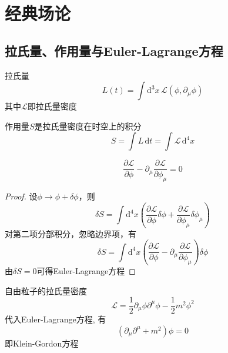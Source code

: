 \section{经典场论}
\subsection{拉氏量、作用量与Euler-Lagrange方程}
\begin{definition}
    拉氏量
    \begin{equation}
        L(t)=\int \mathrm d^3x \, \mathcal{L}(\phi, \partial_\mu \phi)
    \end{equation}
    其中$\mathcal L$即拉氏量密度
\end{definition}
\begin{definition}[作用量]
    作用量$S$是拉氏量密度在时空上的积分
    \begin{equation}
        S = \int L \, \mathrm{d}t=\int\mathcal L\,\mathrm d^4x
    \end{equation}
\end{definition}
\begin{equation}
    \frac{\partial\mathcal L}{\partial\phi}-\partial_\mu\frac{\partial\mathcal L}{\partial\phi_\mu}=0
\end{equation}
\begin{proof}
    设$\phi\to\phi+\delta\phi$，则
    \begin{equation}
        \delta S = \int \mathrm d^4x \left(\frac{\partial\mathcal L}{\partial\phi}\delta\phi + \frac{\partial\mathcal L}{\partial\phi_\mu}\delta\phi_\mu\right)
    \end{equation}
    对第二项分部积分，忽略边界项，有
    \begin{equation}
        \delta S = \int \mathrm d^4x \left(\frac{\partial\mathcal L}{\partial\phi} - \partial_\mu\frac{\partial\mathcal L}{\partial\phi_\mu}\right)\delta\phi
    \end{equation}
    由$\delta S=0$可得Euler-Lagrange方程
\end{proof}
\begin{example}
    自由粒子的拉氏量密度
    \begin{equation}
        \mathcal L = \frac12\partial_\mu\phi\partial^\mu\phi - \frac12 m^2\phi^2
    \end{equation}
    代入Euler-Lagrange方程, 有
    \begin{equation}
        (\partial_\mu\partial^\mu + m^2)\phi = 0
    \end{equation}
    即Klein-Gordon方程
\end{example}
